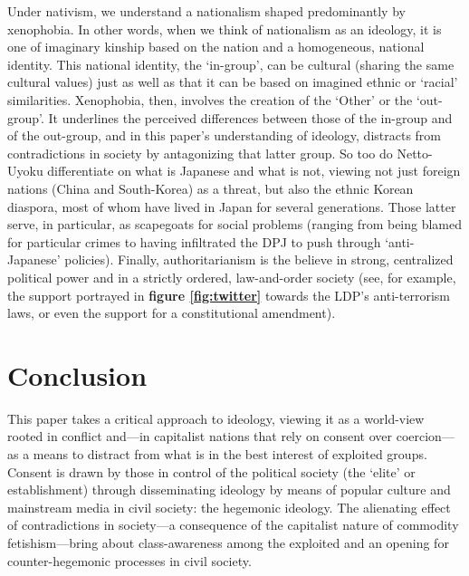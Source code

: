 \documentclass[10pt,british,A4paper,twoside]{memoir}
\begin{document}
Under nativism, we understand a nationalism shaped predominantly by
xenophobia. In other words, when we think of nationalism as an ideology,
it is one of imaginary kinship based on the nation and a homogeneous,
national identity. This national identity, the `in-group', can be
cultural (sharing the same cultural values) just as well as that it can
be based on imagined ethnic or `racial' similarities. Xenophobia, then,
involves the creation of the `Other' or the `out-group'. It underlines
the perceived differences between those of the in-group and of the
out-group, and in this paper's understanding of ideology, distracts from
contradictions in society by antagonizing that latter group. So too do
Netto-Uyoku differentiate on what is Japanese and what is not, viewing
not just foreign nations (China and South-Korea) as a threat, but also
the ethnic Korean diaspora, most of whom have lived in Japan for
several generations. Those latter serve, in particular, as scapegoats for
social problems (ranging from being blamed for particular crimes to
having infiltrated the DPJ to push through `anti-Japanese' policies).
Finally, authoritarianism is the believe in strong, centralized
political power and in a strictly ordered, law-and-order society (see,
for example, the support portrayed in \textbf{figure \ref{fig:twitter}}
towards the LDP's anti-terrorism laws, or even the support for a
constitutional amendment).

\section{Conclusion}\label{conclusion-1}

This paper takes a critical approach to ideology, viewing it as a
world-view rooted in conflict and---in capitalist nations that rely on
consent over coercion---as a means to distract from what is in the best
interest of exploited groups. Consent is drawn by those in control of the
political society (the `elite' or establishment) through disseminating
ideology by means of popular culture and mainstream media in civil
society: the hegemonic ideology. The alienating effect of contradictions
in society---a consequence of the capitalist nature of commodity
fetishism---bring about class-awareness among the exploited and an
opening for counter-hegemonic processes in civil society.
\end{document}
